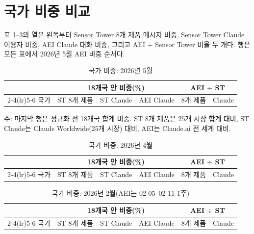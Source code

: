 \documentclass[11pt]{article}
\begin{document}
\section{국가 비중 비교}

표 \ref{tab:share05}--\ref{tab:share02}의 열은 왼쪽부터 Sensor Tower 8개 제품 메시지 비중, Sensor Tower Claude 이용자 비중, AEI Claude 대화 비중, 그리고 AEI $\div$ Sensor Tower 비율 두 개다. 행은 모든 표에서 2026년 5월 AEI 비중 순서다.

\newcommand{\sharehead}{%
\toprule
 & \multicolumn{3}{c}{18개국 안 비중(\%)} & \multicolumn{2}{c}{AEI $\div$ ST} \\
\cmidrule(lr){2-4}\cmidrule(lr){5-6}
국가 & ST 8개 제품 & ST Claude & AEI Claude & 8개 제품 & Claude \\
\midrule}

\begin{table}[htbp]
\centering
\caption{국가 비중: 2026년 5월}\label{tab:share05}
\begin{tabular}{lrrrrr}
\sharehead

\bottomrule
\end{tabular}
\par\smallskip\footnotesize 주: 마지막 행은 정규화 전 18개국 합계 비중. ST 8개 제품은 25개 시장 합계 대비, ST Claude는 Claude Worldwide(25개 시장) 대비, AEI는 Claude.ai 전 세계 대비.
\end{table}

\begin{table}[htbp]
\centering
\caption{국가 비중: 2026년 4월}\label{tab:share04}
\begin{tabular}{lrrrrr}
\sharehead

\bottomrule
\end{tabular}
\end{table}

\begin{table}[htbp]
\centering
\caption{국가 비중: 2026년 2월(AEI는 02-05--02-11 1주)}\label{tab:share02}
\begin{tabular}{lrrrrr}
\sharehead

\bottomrule
\end{tabular}
\end{table}
\end{document}
